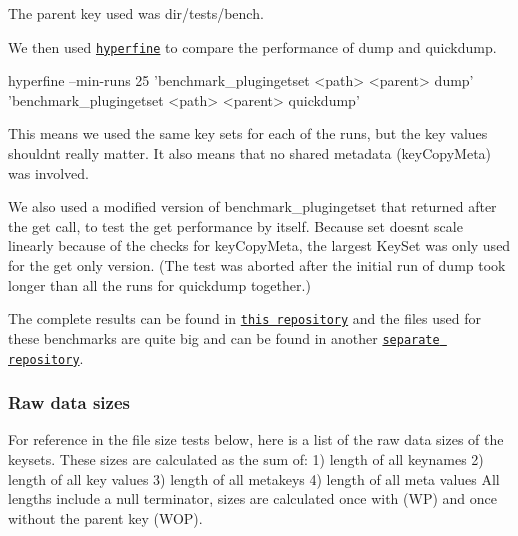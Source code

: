 The parent key used was {\ttfamily dir/tests/bench}.

We then used \href{https://github.com/sharkdp/hyperfine}{\tt {\ttfamily hyperfine}} to compare the performance of {\ttfamily dump} and {\ttfamily quickdump}.


\begin{DoxyCode}
hyperfine --min-runs 25 'benchmark\_plugingetset <path> <parent> dump' 'benchmark\_plugingetset <path>
       <parent> quickdump'
\end{DoxyCode}


This means we used the same key sets for each of the runs, but the key values shouldn\textquotesingle{}t really matter. It also means that no shared metadata ({\ttfamily key\+Copy\+Meta}) was involved.

We also used a modified version of {\ttfamily benchmark\+\_\+plugingetset} that returned after the {\ttfamily get} call, to test the {\ttfamily get} performance by itself. Because {\ttfamily set} doesn\textquotesingle{}t scale linearly because of the checks for {\ttfamily key\+Copy\+Meta}, the largest Key\+Set was only used for the {\ttfamily get} only version. (The test was aborted after the initial run of {\ttfamily dump} took longer than all the runs for {\ttfamily quickdump} together.)

The complete results can be found in \href{https://github.com/ElektraInitiative/rawdata}{\tt this repository} and the files used for these benchmarks are quite big and can be found in another \href{https://github.com/kodebach/eqd-bench}{\tt separate repository}.\hypertarget{autotoc_md546_autotoc_md549}{}\subsubsection{Raw data sizes}\label{autotoc_md546_autotoc_md549}
For reference in the file size tests below, here is a list of the raw data sizes of the keysets. These sizes are calculated as the sum of\+: 1) length of all keynames 2) length of all key values 3) length of all metakeys 4) length of all meta values All lengths include a null terminator, sizes are calculated once with (WP) and once without the parent key (W\+OP).

